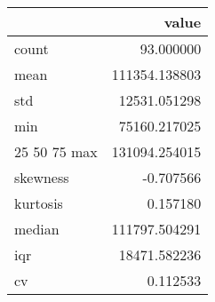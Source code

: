 \begin{tabular}{lr}
\toprule
 & value \\
\midrule
count & 93.000000 \\
mean & 111354.138803 \\
std & 12531.051298 \\
min & 75160.217025 \\
25%
50%
75%
max & 131094.254015 \\
skewness & -0.707566 \\
kurtosis & 0.157180 \\
median & 111797.504291 \\
iqr & 18471.582236 \\
cv & 0.112533 \\
\bottomrule
\end{tabular}
